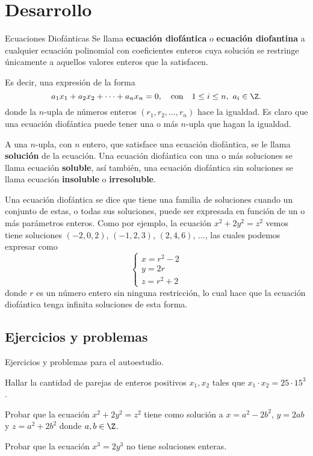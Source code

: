 \section{Desarrollo}

\begin{definition.tcb}{Ecuaciones Diofánticas}{}
    Se llama \textbf{ecuación diofántica} o \textbf{ecuación diofantina} a cualquier ecuación polinomial con coeficientes enteros cuya
    solución se restringe únicamente a aquellos valores enteros que la satisfacen.
\end{definition.tcb}

Es decir, una expresión de la forma
\[
    a_1 x_1 + a_2 x_2 + \cdots + a_n x_n = 0, \quad \text{con} \quad 1 \leq i \leq n,\ a_i \in \Z.
\]
donde la $n$-upla de números enteros $(r_1, r_2, \ldots, r_n)$ hace la igualdad.
Es claro que una ecuación diofántica puede tener una o más $n$-upla que hagan la igualdad.

\begin{definition.tcb}{}{}
    A una $n$-upla, con $n$ entero, que satisface una ecuación diofántica, se le llama \textbf{solución} de la ecuación.
    Una ecuación diofántica con una o más soluciones se llama ecuación \textbf{soluble}, así también, una ecuación diofántica sin
    soluciones se llama ecuación \textbf{insoluble} o \textbf{irresoluble}.
\end{definition.tcb}

Una ecuación diofántica se dice que tiene una familia de soluciones cuando un conjunto de estas, o todas sus soluciones,
puede ser expresada en función de un o más parámetros enteros.
Como por ejemplo, la ecuación $x^2 + 2y^2 = z^2$ vemos tiene soluciones $(-2, 0, 2)$, $(-1, 2, 3)$, $(2, 4, 6)$, $\ldots$,
las cuales podemos expresar como
\[
    \begin{cases}
        x = r^2 - 2\\
        y = 2r\\
        z = r^2 + 2
    \end{cases}
\]
donde $r$ es un número entero sin ninguna restricción, lo cual hace que la ecuación diofántica tenga infinita soluciones de esta forma.


\subsection{Ejercicios y problemas}

Ejercicios y problemas para el autoestudio.

\begin{exercise}
    Hallar la cantidad de parejas de enteros positivos $x_1, x_2$ tales que $x_1 \cdot x_2 = 25 \cdot 15^3$.
\end{exercise}

\begin{exercise}
    Probar que la ecuación $x^2 + 2y^2 = z^2$ tiene como solución a $x = a^2 - 2b^2$, $y = 2ab$ y $z = a^2 + 2b^2$ donde $a, b \in \Z$.
\end{exercise}

\begin{exercise}
    Probar que la ecuación $x^3 = 2y^3$ no tiene soluciones enteras.
\end{exercise}